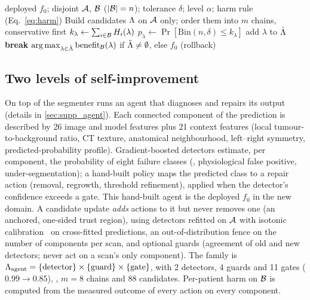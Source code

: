 \begin{algorithm}[t]
\caption{Certified Self-Improvement (one round)}
\label{alg:csi}
\small
\begin{algorithmic}[1]
\Require deployed $f_0$; disjoint $\mathcal{A}$, $\mathcal{B}$ ($|\mathcal{B}|=n$); tolerance $\delta$; level $\alpha$; harm rule (Eq.~\ref{eq:harm})
\State Build candidates $\Lambda$ on $\mathcal{A}$ only; order them into $m$ chains, conservative first
    \State $k_\lambda\gets\sum_{i\in\mathcal{B}}H_i(\lambda)$ 
    \State $p_\lambda\gets\Pr[\mathrm{Bin}(n,\delta)\le k_\lambda]$
     add $\lambda$ to $\hat{\Lambda}$ \Else{} \textbf{break} \EndIf
  \EndFor
\EndFor
\State \Return $\arg\max_{\lambda\in\hat{\Lambda}}\mathrm{benefit}_{\mathcal{B}}(\lambda)$ if $\hat{\Lambda}\neq\emptyset$, else $f_0$ (rollback)
\end{algorithmic}
\end{algorithm}

\subsection{Two levels of self-improvement}
\label{sec:levels}

On top of the segmenter runs an agent that diagnoses and repairs its output (details in \cref{sec:supp_agent}).
Each connected component of the prediction is described by 26 image and model features plus 21 context features (local tumour-to-background ratio, CT texture, anatomical neighbourhood, left--right symmetry, predicted-probability profile).
Gradient-boosted detectors estimate, per component, the probability of eight failure classes (\eg, physiological false positive, under-segmentation); a hand-built policy maps the predicted class to a repair action (removal, regrowth, threshold refinement), applied when the detector's confidence exceeds a gate.
This hand-built agent is the deployed $f_0$ in the new domain.
A candidate update \emph{adds} actions to it but never removes one (an anchored, one-sided trust region), using detectors refitted on $\mathcal{A}$ with isotonic calibration~\cite{guo2017calibration} on cross-fitted predictions, an out-of-distribution fence on the number of components per scan, and optional guards (agreement of old and new detectors; never act on a scan's only component).
The family is
$\Lambda_{\text{agent}}=\{\text{detector}\}\times\{\text{guard}\}\times\{\text{gate}\}$, with 2 detectors, 4 guards and 11 gates ($0.99\to0.85$), \ie, $m=8$ chains and 88 candidates.
Per-patient harm on $\mathcal{B}$ is computed from the measured outcome of every action on every component.

